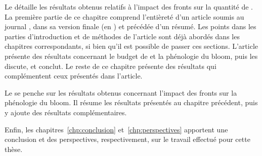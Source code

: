 Le  détaille les résultats obtenus relatifs à l'impact des fronts sur la quantité de .
La première partie de ce chapitre comprend l'entièreté d'un article soumis au journal , dans sa version finale (en ) et précédée d'un résumé.
Les points dans les parties d'introduction et de méthodes de l'article sont déjà abordés dans les chapitres correspondants, si bien qu'il est possible de passer ces sections.
L'article présente des résultats concernant le budget de  et la phénologie du bloom, puis les discute, et conclut.
Le reste de ce chapitre présente des résultats qui complémentent ceux présentés dans l'article.

Le  se penche sur les résultats obtenus concernant l'impact des fronts sur la phénologie du bloom.
Il résume les résultats présentés au chapitre précédent, puis y ajoute des résultats complémentaires.

Enfin, les chapitres~\ref{chp:conclusion} et~\ref{chp:perspectives} apportent une conclusion et des perspectives, respectivement, sur le travail effectué pour cette thèse.
